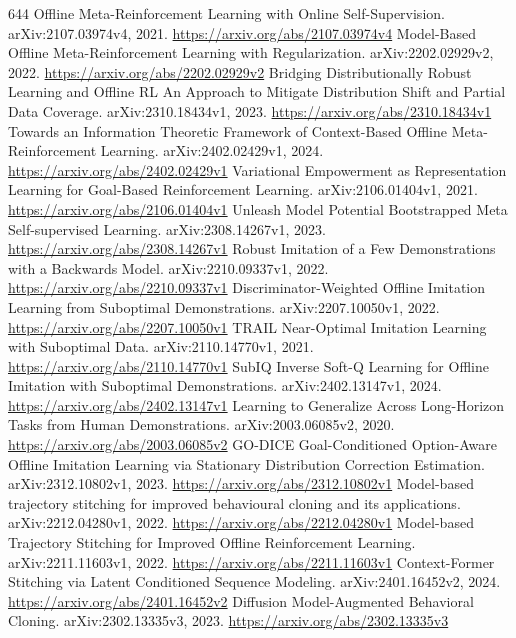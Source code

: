 \documentclass[11pt]{article}
\begin{document}
\begin{thebibliography}{644}
 Offline Meta-Reinforcement Learning with Online Self-Supervision. arXiv:2107.03974v4, 2021. \url{https://arxiv.org/abs/2107.03974v4}
 Model-Based Offline Meta-Reinforcement Learning with Regularization. arXiv:2202.02929v2, 2022. \url{https://arxiv.org/abs/2202.02929v2}
 Bridging Distributionally Robust Learning and Offline RL An Approach to Mitigate Distribution Shift and Partial Data Coverage. arXiv:2310.18434v1, 2023. \url{https://arxiv.org/abs/2310.18434v1}
 Towards an Information Theoretic Framework of Context-Based Offline Meta-Reinforcement Learning. arXiv:2402.02429v1, 2024. \url{https://arxiv.org/abs/2402.02429v1}
 Variational Empowerment as Representation Learning for Goal-Based Reinforcement Learning. arXiv:2106.01404v1, 2021. \url{https://arxiv.org/abs/2106.01404v1}
 Unleash Model Potential Bootstrapped Meta Self-supervised Learning. arXiv:2308.14267v1, 2023. \url{https://arxiv.org/abs/2308.14267v1}
 Robust Imitation of a Few Demonstrations with a Backwards Model. arXiv:2210.09337v1, 2022. \url{https://arxiv.org/abs/2210.09337v1}
 Discriminator-Weighted Offline Imitation Learning from Suboptimal Demonstrations. arXiv:2207.10050v1, 2022. \url{https://arxiv.org/abs/2207.10050v1}
 TRAIL Near-Optimal Imitation Learning with Suboptimal Data. arXiv:2110.14770v1, 2021. \url{https://arxiv.org/abs/2110.14770v1}
 SubIQ Inverse Soft-Q Learning for Offline Imitation with Suboptimal Demonstrations. arXiv:2402.13147v1, 2024. \url{https://arxiv.org/abs/2402.13147v1}
 Learning to Generalize Across Long-Horizon Tasks from Human Demonstrations. arXiv:2003.06085v2, 2020. \url{https://arxiv.org/abs/2003.06085v2}
 GO-DICE Goal-Conditioned Option-Aware Offline Imitation Learning via Stationary Distribution Correction Estimation. arXiv:2312.10802v1, 2023. \url{https://arxiv.org/abs/2312.10802v1}
 Model-based trajectory stitching for improved behavioural cloning and its applications. arXiv:2212.04280v1, 2022. \url{https://arxiv.org/abs/2212.04280v1}
 Model-based Trajectory Stitching for Improved Offline Reinforcement Learning. arXiv:2211.11603v1, 2022. \url{https://arxiv.org/abs/2211.11603v1}
 Context-Former Stitching via Latent Conditioned Sequence Modeling. arXiv:2401.16452v2, 2024. \url{https://arxiv.org/abs/2401.16452v2}
 Diffusion Model-Augmented Behavioral Cloning. arXiv:2302.13335v3, 2023. \url{https://arxiv.org/abs/2302.13335v3}

\end{thebibliography}
\end{document}
